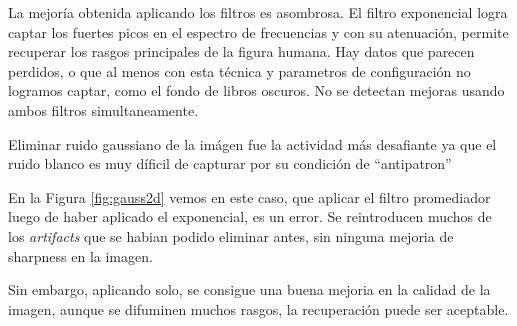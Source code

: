La mejor\'ia obtenida aplicando los filtros es asombrosa.
El filtro exponencial logra captar los fuertes picos en el espectro de
frecuencias y con su atenuaci\'on, permite recuperar los rasgos principales
de la figura humana.
Hay datos que parecen perdidos, o que al menos con esta t\'ecnica y
parametros de configuraci\'on no logramos captar, como el fondo de
libros oscuros. No se detectan mejoras usando ambos filtros simultaneamente.

Eliminar ruido gaussiano de la im\'agen fue la actividad m\'as desafiante
ya que el ruido blanco es muy d\'ificil de capturar por su condici\'on de ``antipatron''

En la Figura \ref{fig:gauss2d} vemos en este caso, que aplicar el filtro
promediador luego de haber aplicado el exponencial, es un error. 
Se reintroducen muchos de los \textit{artifacts} que se habian podido
eliminar antes, sin ninguna mejoria de sharpness en la imagen. 

Sin embargo, aplicando solo, se consigue una buena mejoria en la calidad
de la imagen, aunque se difuminen muchos rasgos, la recuperaci\'on puede ser aceptable.

